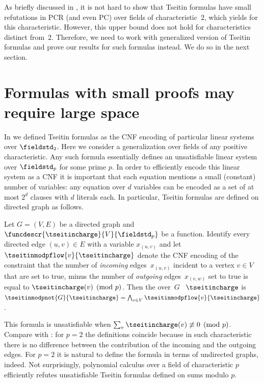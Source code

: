 \documentclass{toc}
\begin{document}
As briefly discussed in 
, 
it is not hard to show that Tseitin formulas have small 
refutations in PCR (and even PC) over fields of characteristic~$2$,
which yields
for this characteristic. 
However, this upper bound does not hold for characteristics distinct
from~$2$. 
%
Therefore, we need to work with generalized version of Tseitin formulas
and prove our results for such formulas instead. We do so in the next section.
%

\section{Formulas with small proofs may require large space}
\label{sec:tseitinseparation}

In  we defined Tseitin formulas as the
CNF encoding of particular linear systems over $\fieldstd_{2}$.  Here we
consider a generalization over fields of any positive characteristic.
%
Any such formula essentially defines an unsatisfiable linear system over
$\fieldstd_{p}$ for some prime $p$. In order to efficiently encode this
linear system as a CNF it is important that each equation mentions a
small (\egComma constant) number of variables: any equation over $d$
variables can be encoded as a set of at most $2^{d}$ clauses with $d$
literals each.  In particular, Tseitin formulas are defined on
directed graph as follows.

\begin{definition}\label{def:tseitinmodp}
  Let $G = (V,E)$ be a directed graph and
  $\funcdescr{\tseitincharge}{V}{\fieldstd_p}$
  be a function.
  Identify every directed edge $(u,v) \in E$ with a variable $x_{(u,v)}$
  and  let
  $\tseitinmodpflow{v}{\tseitincharge}$
  denote the CNF encoding
  of the constraint
  that the number of \emph{incoming} edges~$x_{(u,v)}$ incident to a vertex $v \in V$ that are set to true, minus the number of \emph{outgoing} edges~$x_{(v,w)}$ set to true is equal to $\tseitincharge(v) \pmod{p}$.
  Then the  over~$G$ \wrt{}~$\tseitincharge$
  is $\tseitinmodpnot{G}{\tseitincharge}=
  \bigwedge_{v\in V}\tseitinmodpflow{v}{\tseitincharge}$.
\end{definition}

This formula is unsatisfiable when $\sum_{v}\tseitincharge(v)\not\equiv 0
\pmod{p}$. Compare  with
: for $p=2$ the definitions
coincide because in such characteristic there is no difference
between the contribution of the incoming and the outgoing edges. For
$p=2$ it is natural to define the formula in terms of undirected
graphs, indeed.
%
Not surprisingly, polynomial calculus over a field of characteristic
$p$ efficiently refutes unsatisfiable Tseitin formulas defined on
sums modulo $p$.
\end{document}
